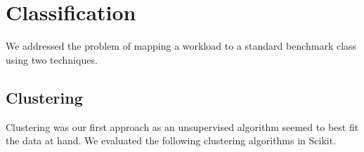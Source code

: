 \section{Classification} \label{sec:classfication}

We addressed the problem of mapping a workload to a standard benchmark class
using two techniques.

\subsection{Clustering}
\label{sec:clustering}

Clustering was our first approach as an unsupervised algorithm seemed to best
fit the data at hand.
We evaluated the following clustering algorithms in Scikit.\\

